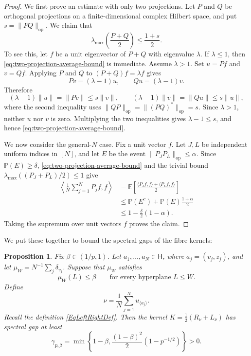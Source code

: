\documentclass[11pt, reqno]{amsart}
\numberwithin{equation}{section}
\newtheorem{proposition}[theorem]{Proposition}
\newcommand{\Heis}{\mathsf H}
\newcommand{\Prob}{\mathbb P}
\newcommand{\E}{\mathbb E}
\begin{document}
\begin{proof}
We first prove an estimate with only two projections.  Let \(P\) and \(Q\)
be orthogonal projections on a finite-dimensional complex Hilbert space, and
put \(s=\|PQ\|_{\operatorname{op}}\).  We claim that
\begin{equation}\label{eq:two-projection-average-bound}
    \lambda_{\max}\left(\frac{P+Q}{2}\right)
    \le \frac{1+s}{2}.
\end{equation}
To see this, let \(f\) be a unit eigenvector of \(P+Q\) with eigenvalue \(\lambda\).  If
\(\lambda\le1\), then \eqref{eq:two-projection-average-bound} is immediate.
Assume \(\lambda>1\).  Set \(u=Pf\) and \(v=Qf\).  Applying \(P\) and \(Q\) to
\((P+Q)f=\lambda f\) gives
\[
    Pv=(\lambda-1)u,
    \qquad
    Qu=(\lambda-1)v.
\]
Therefore
\[
    (\lambda-1)\|u\|=\|Pv\|\le s\|v\|,
    \qquad
    (\lambda-1)\|v\|=\|Qu\|\le s\|u\|,
\]
where the second inequality uses \(\|QP\|_{\operatorname{op}}=
\|(PQ)^*\|_{\operatorname{op}}=s\).  Since \(\lambda>1\), neither \(u\) nor
\(v\) is zero.  Multiplying the two inequalities gives \(\lambda-1\le s\),
and hence \eqref{eq:two-projection-average-bound}.

We now consider the general-$N$ case. Fix a unit vector \(f\).  Let \(J,L\) be independent uniform indices in
\([N]\), and let \(E\) be the event
\(\|P_JP_L\|_{\operatorname{op}}\le\alpha\).  Since \(\Prob(E)\ge\delta\),
\eqref{eq:two-projection-average-bound} and the trivial bound
\(\lambda_{\max}((P_J+P_L)/2)\le1\) give
\[
\begin{aligned}
    \left\langle\frac1N\sum_{j=1}^NP_j f,f\right\rangle
    &=\E\left[\frac{\langle P_Jf,f\rangle+\langle P_Lf,f\rangle}{2}\right]\\
    &\le \Prob(E^c)+\Prob(E)\frac{1+\alpha}{2}\\
    &\le 1-\frac\delta2(1-\alpha).
\end{aligned}
\]
Taking the supremum over unit vectors \(f\) proves the claim.

\end{proof}

We put these together to bound the spectral gaps of the fibre kernels:

\begin{proposition}\label{prop:heis-fibre-gap}
Fix \(\beta\in(1/p,1)\).  Let \(a_1,\ldots,a_N\in\Heis\), where
\(a_j=(v_j,z_j)\), and let \(\mu_W=N^{-1}\sum_j\delta_{v_j}\).  Suppose that \(\mu_W\) satisfies
\begin{equation}\label{eq:heis-hyperplane-balance-fibre}
    \mu_W(L)\le\beta
    \qquad\text{for every hyperplane }L\le W.
\end{equation}
Define
\[
\nu =
\frac1N\sum_{j=1}^N u_{\langle a_j\rangle}.
\]
Recall the definition \eqref{EqLeftRightDef}. Then the kernel $K=\frac12(R_\nu+L_\nu)$ has spectral gap at least
\begin{equation}\label{eq:heis-gamma-beta}
    \gamma_{p,\beta}
    =\min\left\{1-\beta,
    \frac{(1-\beta)^2}{2}(1-p^{-1/2})\right\}>0.
\end{equation}
\end{proposition}
\end{document}
